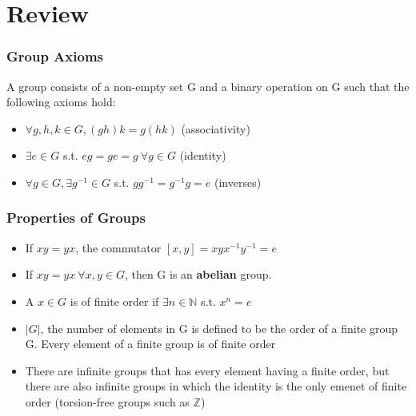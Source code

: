 \documentclass[../Odyssey_Project.tex]{subfiles}
\begin{document}
\setcounter{section}{0}
\section{Review}
\subsubsection*{Group Axioms}
A group consists of a non-empty set G and a binary operation on G such that the following axioms hold:
\begin{itemize}
    \item \(\forall g, h, k \in G, (gh)k = g(hk)\) (associativity)
    \item \(\exists e \in G\) s.t. \(eg = ge = g \ \forall g \in G\) (identity)
    \item \(\forall g \in G, \exists g^{-1} \in G\) s.t. \(gg^{-1} = g^{-1}g = e\) (inverses)
\end{itemize}
\subsubsection*{Properties of Groups}
\begin{itemize}
    \item If \(xy = yx\), the commutator \([x,y] = xyx^{-1}y^{-1} = e\)
    \item If \(xy = yx \ \forall x,y \in G \), then G is an \textbf{abelian} group. 
    \item A \(x \in G\) is of finite order if \(\exists n \in \mathbb{N}\) s.t. \(x^n = e\)
    \item \(|G|\), the number of elements in G is defined to be the order of a finite group G. Every element of a finite group is of finite order
    \item There are infinite groups that has every element having a finite order, but there are also infinite groups in which the identity is the only emenet of finite order (torsion-free groups such as \(\mathbb{Z}\))
\end{itemize}
\end{document}
